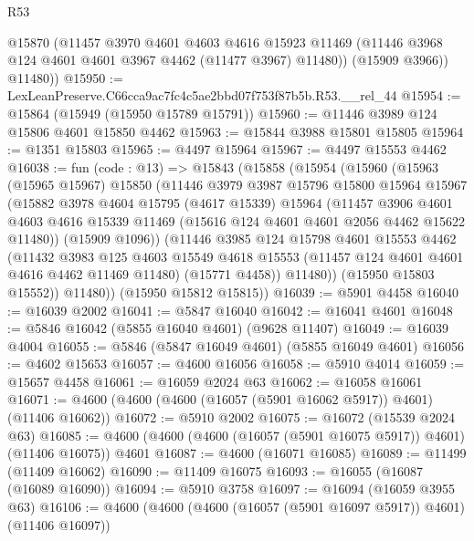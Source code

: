 \begin{lexlean}{R53}
\begin{coremodule}
          @15870
          (@11457
            @3970
            @4601
            @4603
            @4616
            @15923
            @11469
            (@11446 @3968 @124 @4601 @4601 @3967 @4462 (@11477 @3967) @11480))
          (@15909 @3966))
        @11480))
@15950 := LexLeanPreserve.C66cca9ac7fc4c5ae2bbd07f753f87b5b.R53.__rel_44
@15954 := @15864 (@15949 (@15950 @15789 @15791))
@15960 := @11446 @3989 @124 @15806 @4601 @15850 @4462
@15963 := @15844 @3988 @15801 @15805
@15964 := @1351 @15803
@15965 := @4497 @15964
@15967 := @4497 @15553 @4462
@16038 := fun (code : @13) =>
  @15843
    (@15858
      (@15954
        (@15960
          (@15963
            (@15965 @15967)
            @15850
            (@11446
              @3979
              @3987
              @15796
              @15800
              @15964
              @15967
              (@15882
                @3978
                @4604
                @15795
                (@4617 @15339)
                @15964
                (@11457
                  @3906
                  @4601
                  @4603
                  @4616
                  @15339
                  @11469
                  (@15616 @124 @4601 @4601 @2056 @4462 @15622 @11480))
                (@15909 @1096))
              (@11446
                @3985
                @124
                @15798
                @4601
                @15553
                @4462
                (@11432
                  @3983
                  @125
                  @4603
                  @15549
                  @4618
                  @15553
                  (@11457 @124 @4601 @4601 @4616 @4462 @11469 @11480)
                  (@15771 @4458))
                @11480))
            (@15950 @15803 @15552))
          @11480))
      (@15950 @15812 @15815))
@16039 := @5901 @4458
@16040 := @16039 @2002
@16041 := @5847 @16040
@16042 := @16041 @4601
@16048 := @5846 @16042 (@5855 @16040 @4601) (@9628 @11407)
@16049 := @16039 @4004
@16055 := @5846 (@5847 @16049 @4601) (@5855 @16049 @4601)
@16056 := @4602 @15653
@16057 := @4600 @16056
@16058 := @5910 @4014
@16059 := @15657 @4458
@16061 := @16059 @2024 @63
@16062 := @16058 @16061
@16071 := @4600 (@4600 (@4600 (@16057 (@5901 @16062 @5917)) @4601) (@11406 @16062))
@16072 := @5910 @2002
@16075 := @16072 (@15539 @2024 @63)
@16085 := @4600 (@4600 (@4600 (@16057 (@5901 @16075 @5917)) @4601) (@11406 @16075)) @4601
@16087 := @4600 (@16071 @16085)
@16089 := @11499 (@11409 @16062)
@16090 := @11409 @16075
@16093 := @16055 (@16087 (@16089 @16090))
@16094 := @5910 @3758
@16097 := @16094 (@16059 @3955 @63)
@16106 := @4600 (@4600 (@4600 (@16057 (@5901 @16097 @5917)) @4601) (@11406 @16097))

\end{coremodule}
\end{lexlean}
